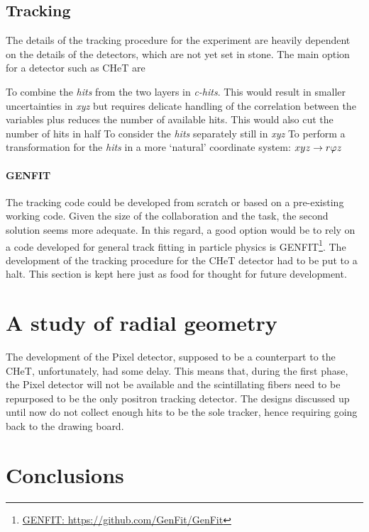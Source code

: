 \begin{refsection}
    \subsection{Tracking}
    The details of the tracking procedure for the experiment are heavily dependent on the details of the detectors, which are not yet set in stone.
    The main option for a detector such as CHeT are
    \begin{outline}
        \1 To combine the \textit{hits} from the two layers in \textit{c-hits}. This would result in smaller uncertainties in \textit{xyz} but requires delicate handling of the correlation between the variables plus reduces the number of available hits. This would also cut the number of hits in half
        \1 To consider the \textit{hits} separately still in \textit{xyz}
        \1 To perform a transformation for the \textit{hits} in a more `natural' coordinate system: $xyz\rightarrow r\varphi z$
    \end{outline}

    \paragraph{GENFIT}
        The tracking code could be developed from scratch or based on a pre-existing working code. 
        Given the size of the collaboration and the task, the second solution seems more adequate.
        In this regard, a good option would be to rely on a code developed for general track fitting in particle physics is GENFIT\footnote{\href{https://github.com/GenFit/GenFit}{GENFIT: https://github.com/GenFit/GenFit}}.
        The development of the tracking procedure for the CHeT detector had to be put to a halt. This section is kept here just as food for thought for future development.

\section{A study of radial geometry}
    The development of the Pixel detector, supposed to be a counterpart to the CHeT, unfortunately, had some delay.
    This means that, during the first phase, the Pixel detector will not be available and the scintillating fibers need to be repurposed to be the only positron tracking detector.
    The designs discussed up until now do not collect enough hits to be the sole tracker, hence requiring going back to the drawing board.
    
\section{Conclusions}

\printbibliography[
    heading = bibliographychapter,
    title=Bibliography on muEDM positron tracker
]

\end{refsection}